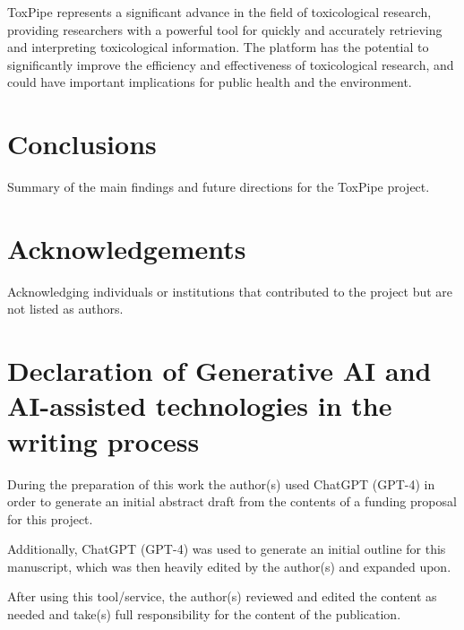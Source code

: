 \documentclass[
  super,
  preprint,
  5p,
  twocolumn]{elsarticle}
\begin{document}
ToxPipe represents a significant advance in the field of toxicological
research, providing researchers with a powerful tool for quickly and
accurately retrieving and interpreting toxicological information. The
platform has the potential to significantly improve the efficiency and
effectiveness of toxicological research, and could have important
implications for public health and the environment.

\hypertarget{conclusions}{%
\section{Conclusions}\label{conclusions}}

Summary of the main findings and future directions for the ToxPipe
project.

\hypertarget{acknowledgements}{%
\section{Acknowledgements}\label{acknowledgements}}

Acknowledging individuals or institutions that contributed to the
project but are not listed as authors.

\hypertarget{declaration-of-generative-ai-and-ai-assisted-technologies-in-the-writing-process}{%
\section{Declaration of Generative AI and AI-assisted technologies in
the writing
process}\label{declaration-of-generative-ai-and-ai-assisted-technologies-in-the-writing-process}}

During the preparation of this work the author(s) used ChatGPT (GPT-4)
in order to generate an initial abstract draft from the contents of a
funding proposal for this project.

Additionally, ChatGPT (GPT-4) was used to generate an initial outline
for this manuscript, which was then heavily edited by the author(s) and
expanded upon.

After using this tool/service, the author(s) reviewed and edited the
content as needed and take(s) full responsibility for the content of the
publication.


  
\end{document}
